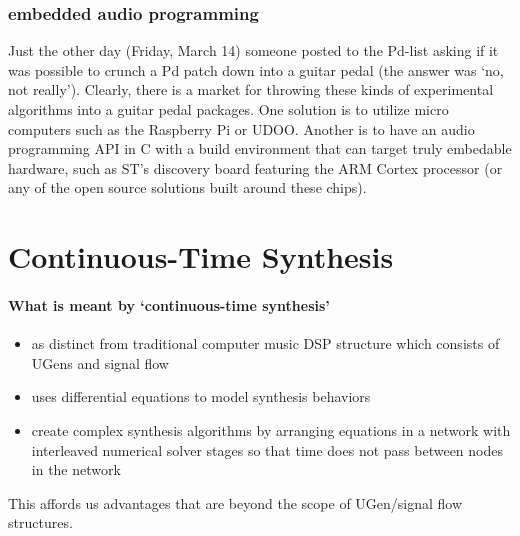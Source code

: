 \documentclass{article}
\begin{document}
\subsubsection{embedded audio programming}
Just the other day (Friday, March 14) someone posted to the Pd-list asking if it was possible to crunch a Pd patch down into a guitar pedal (the answer was `no, not really'). Clearly, there is a market for throwing these kinds of experimental algorithms into a guitar pedal packages. One solution is to utilize micro computers such as the Raspberry Pi or UDOO. Another is to have an audio programming API in C with a build environment that can target truly embedable hardware, such as ST's discovery board featuring the ARM Cortex processor (or any of the open source solutions built around these chips).

\section{Continuous-Time Synthesis}
\paragraph{What is meant by `continuous-time synthesis'}
\begin{itemize}
\item as distinct from traditional computer music DSP structure which consists of UGens and signal flow
\item uses differential equations to model synthesis behaviors
\item create complex synthesis algorithms by arranging equations in a network with interleaved numerical solver stages so that time does not pass between nodes in the network
\end{itemize}
This affords us advantages that are beyond the scope of UGen/signal flow structures.
\end{document}
